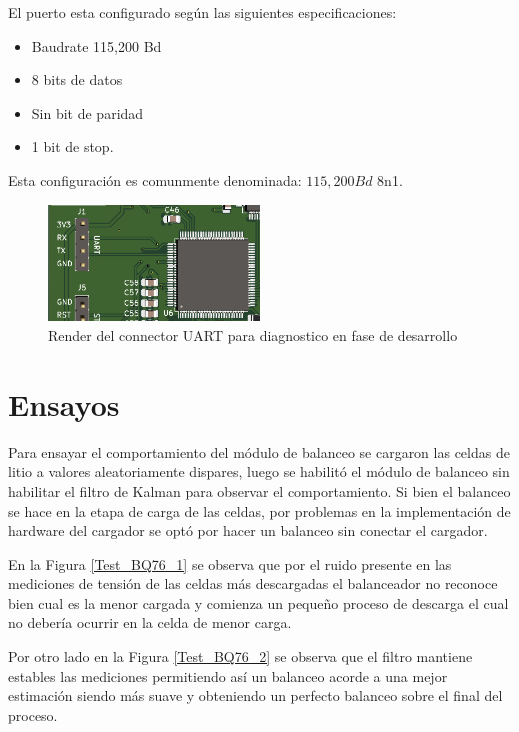\documentclass[10pt, a4paper]{article}
\begin{document}
El puerto esta configurado según las siguientes especificaciones:
\begin{itemize}
	\item Baudrate 115,200 Bd
	\item 8 bits de datos
	\item Sin bit de paridad
	\item 1 bit de stop.
\end{itemize}

Esta configuración es comunmente denominada: $115,200 Bd$ 8n1.

\begin{figure}[h!]
	\begin{center}
		\includegraphics[width=0.5\textwidth]{connector_UART.png}
		\caption{Render del connector UART para diagnostico en fase de desarrollo}
		\label{UART_Connector}
	\end{center}
\end{figure}
\FloatBarrier



\clearpage

\section{Ensayos}\label{ensayos}

Para ensayar el comportamiento del módulo de balanceo se cargaron las celdas de litio a valores aleatoriamente dispares, luego se habilitó el módulo de balanceo sin habilitar el filtro de Kalman para observar el comportamiento.
Si bien el balanceo se hace en la etapa de carga de las celdas, por problemas en la implementación de hardware del cargador se optó por hacer un balanceo sin conectar el cargador.

En la Figura \ref{Test_BQ76_1} se observa que por el ruido presente en las mediciones de tensión de las celdas más descargadas el balanceador no reconoce bien cual es la menor cargada y comienza un pequeño proceso de descarga el cual no debería ocurrir en la celda de menor carga.

Por otro lado en la Figura \ref{Test_BQ76_2} se observa que el filtro mantiene estables las mediciones permitiendo así un balanceo acorde a una mejor estimación siendo más suave y obteniendo un perfecto balanceo sobre el final del proceso.		
\end{document}
